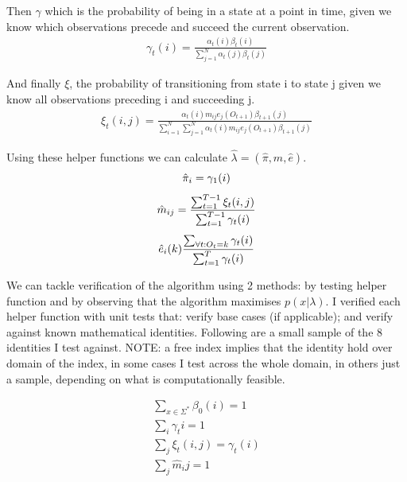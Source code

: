 Then $\gamma$ which is the probability of being in a state at a point in time, given we know which observations precede and succeed the current observation.
\begin{gather*}
    \gamma_t(i) = \frac{\alpha_t(i) \beta_t(i)}{\sum_{j=1}^N \alpha_t(j) \beta_t(j)}
\end{gather*}

And finally $\xi$, the probability of transitioning from state i to state j given we know all observations preceding i and succeeding j.
\begin{gather*}
    \xi_t(i, j) = \frac{\alpha_t(i) m_{ij} e_j(O_{t+1}) \beta_{t+1}(j)}{\sum_{i=1}^N \sum_{j=1}^N \alpha_t(i) m_{ij} e_j(O_{t+1}) \beta_{t+1}(j)}
\end{gather*}

Using these helper functions we can calculate $\hat{\lambda}=(\hat{\pi}, \hat{m}, \hat{e})$.
\begin{gather*}
    \hat{\pi}_i = \gamma_1(i)\biggbreak
    \hat{m}_{ij} = \frac{\sum_{t=1}^{T-1} \xi_t(i,j)}{\sum_{t=1}^{T-1} \gamma_t(i)}\biggbreak
    \hat{e}_i(k) \frac{\sum_{\forall t: O_t = k} \gamma_t(i)}{\sum_{t=1}^T \gamma_t(i)}
\end{gather*}


We can tackle verification of the algorithm using 2 methods: by testing helper function and by observing that the algorithm maximises $p(x|\lambda)$. I verified each helper function with unit tests that: verify base cases (if applicable); and verify against known mathematical identities. Following are a small sample of the 8 identities I test against. NOTE: a free index implies that the identity hold over domain of the index, in some cases I test across the whole domain, in others just a sample, depending on what is computationally feasible.

\begin{gather*}
    \sum_{x \in \Sigma^*} \beta_0(i) = 1\\
    \sum_{i} \gamma_t{i} = 1\\
    \sum_{j} \xi_t(i,j) = \gamma_t(i)\\
    \sum_j \hat{m}_ij = 1\\
\end{gather*}


